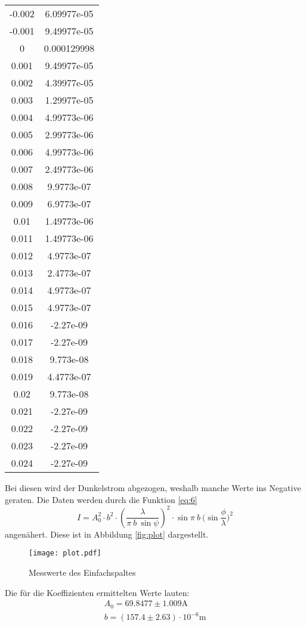 \begin{table}[H]
\begin{tabular}{c c}
 -0.002       &  6.09977e-05 \\
 -0.001       &  9.49977e-05 \\
  0           &  0.000129998 \\
  0.001       &  9.49977e-05 \\
  0.002       &  4.39977e-05 \\
  0.003       &  1.29977e-05 \\
  0.004       &  4.99773e-06 \\
  0.005       &  2.99773e-06 \\
  0.006       &  4.99773e-06 \\
  0.007       &  2.49773e-06 \\
  0.008       &  9.9773e-07  \\
  0.009       &  6.9773e-07  \\
  0.01        &  1.49773e-06 \\
  0.011       &  1.49773e-06 \\
  0.012       &  4.9773e-07  \\
  0.013       &  2.4773e-07  \\
  0.014       &  4.9773e-07  \\
  0.015       &  4.9773e-07  \\
  0.016       & -2.27e-09    \\
  0.017       & -2.27e-09    \\
  0.018       &  9.773e-08   \\
  0.019       &  4.4773e-07  \\
  0.02        &  9.773e-08   \\
  0.021       & -2.27e-09    \\
  0.022       & -2.27e-09    \\
  0.023       & -2.27e-09    \\
  0.024       & -2.27e-09    \\
   \bottomrule
  \end{tabular}
 \end{table} 
  Bei diesen wird der Dunkelstrom abgezogen, weshalb manche Werte ins Negative geraten.
  Die Daten werden durch die Funktion \ref{eq:6}
  \begin{equation*}
    I=A_0^2\cdot b^2\cdot (\dfrac{\lambda}{\pi \ b \ \sin{\psi}})^2 \cdot \sin{\pi \ b \ (\sin{\dfrac{\phi}{\lambda}}})^2
  \end{equation*}
  angenähert. Diese ist in Abbildung \ref{fig:plot} dargestellt.
  \begin{figure}
    \centering
    \texttt{[image: plot.pdf]}
    \caption{Messwerte des Einfachspaltes}
    \label{fig:doppel}
  \end{figure}
  Die für die Koeffizienten ermittelten Werte lauten:
  \begin{align*}
    A_0 = 69.8477 \pm 1.009 \si{\ampere}\\
    b = (157.4 \pm 2.63) \cdot 10^{-6} \si{\metre}
  \end{align*}
  

